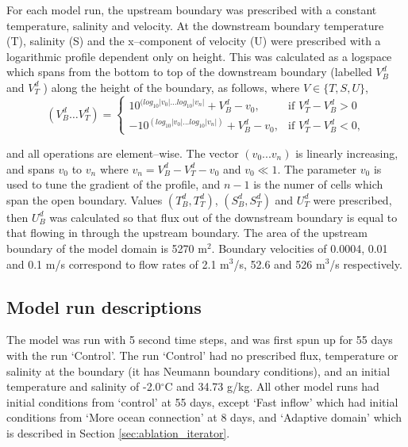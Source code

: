 For each model run, the upstream boundary was prescribed with a constant temperature, salinity and velocity. At the downstream boundary temperature (T), salinity (S) and the x--component of velocity (U) were prescribed with a logarithmic profile dependent only on height. This was calculated as a logspace which spans from the bottom to top of the downstream boundary (labelled $V^d_B$ and $V^d_T $ ) along the height of the boundary, as follows, where $V \in \{T,S,U\}$,
\[
    \left(V^d_B \dots V^d_T \right)= 
\begin{cases}
    10^{(log_{10}|v_0|...log_{10}|v_n|} + V^d_B - v_0, & \text{if } V^d_T - V^d_B>0\\
    -10^{(log_{10}|v_0|...log_{10}|v_n|)} + V^d_B - v_0,              & \text{if }   V^d_T - V^d_B<0,
\end{cases}
\]

and all operations are element--wise. The vector $(v_0...v_n)$ is linearly increasing, and spans $v_0$ to $v_n$ where $ v_n = V^d_B - V^d_T-v_0$ and $v_0 \ll 1$. The parameter $v_0$ is used to tune the gradient of the profile, and $n-1$ is the numer of cells which span the open boundary.
Values $\left(T^d_B, T^d_T\right)$, $\left(S^d_B, S^d_T\right)$ and $U^d_T$  were prescribed, then  $U^d_B$ was calculated so that flux out of the downstream boundary is equal to that flowing in through the upstream boundary.
The area of the upstream boundary of the model domain is 5270 $\mathrm{m}^2$. Boundary velocities of 0.0004, 0.01 and 0.1 $\mathrm{m}$/s correspond to flow rates of 2.1 $\mathrm{m}^3$/s, 52.6 and 526 $\mathrm{m}^3$/s respectively. 

\subsection{Model run descriptions} \label{sec:model_runs}

The model was run with 5 second time steps, and was first spun up for 55 days with the run `Control'. The run `Control' had no prescribed flux, temperature or salinity at the boundary (it has Neumann boundary conditions), and an initial temperature and salinity of  -2.0$^{\circ}$C  and 34.73 g/kg. All other model runs had initial conditions from `control' at 55 days, except `Fast inflow' which had initial conditions from `More ocean connection' at 8 days, and `Adaptive domain' which is described in Section \ref{sec:ablation_iterator}.

